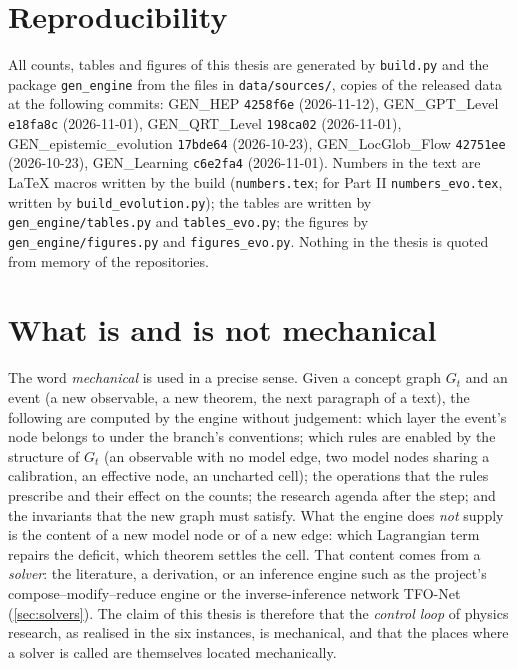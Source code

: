 \documentclass[11pt,a4paper,twoside,openany]{report}
\theoremstyle{plain}
\theoremstyle{definition}
\theoremstyle{remark}
\begin{document}
\section{Reproducibility}\label{sec:provenance}
All counts, tables and figures of this thesis are generated by \texttt{build.py} and the package \texttt{gen\_engine} from the files in \texttt{data/sources/}, copies of the released data at the following commits: GEN\_HEP \texttt{4258f6e} (2026-11-12), GEN\_GPT\_Level \texttt{e18fa8c} (2026-11-01), GEN\_QRT\_Level \texttt{198ca02} (2026-11-01), GEN\_epistemic\_evolution \texttt{17bde64} (2026-10-23), GEN\_LocGlob\_Flow \texttt{42751ee} (2026-10-23), GEN\_Learning \texttt{c6e2fa4} (2026-11-01). Numbers in the text are LaTeX macros written by the build (\texttt{numbers.tex}; for Part II \texttt{numbers\_evo.tex}, written by \texttt{build\_evolution.py}); the tables are written by \texttt{gen\_engine/tables.py} and \texttt{tables\_evo.py}; the figures by \texttt{gen\_engine/figures.py} and \texttt{figures\_evo.py}. Nothing in the thesis is quoted from memory of the repositories.

\section{What is and is not mechanical}\label{sec:scope}
The word \emph{mechanical} is used in a precise sense. Given a concept graph $G_t$ and an event (a new observable, a new theorem, the next paragraph of a text), the following are computed by the engine without judgement: which layer the event's node belongs to under the branch's conventions; which rules are enabled by the structure of $G_t$ (an observable with no model edge, two model nodes sharing a calibration, an effective node, an uncharted cell); the operations that the rules prescribe and their effect on the counts; the research agenda after the step; and the invariants that the new graph must satisfy. What the engine does \emph{not} supply is the content of a new model node or of a new edge: which Lagrangian term repairs the deficit, which theorem settles the cell. That content comes from a \emph{solver}: the literature, a derivation, or an inference engine such as the project's compose--modify--reduce engine or the inverse-inference network TFO-Net (\cref{sec:solvers}). The claim of this thesis is therefore that the \emph{control loop} of physics research, as realised in the six instances, is mechanical, and that the places where a solver is called are themselves located mechanically.
\end{document}
